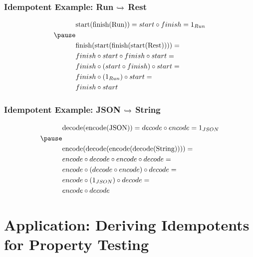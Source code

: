 \documentclass{beamer}
\begin{document}
\begin{frame}[fragile]
\frametitle{Idempotent Example: Run {$\xhookrightarrow{}$} Rest}
\medskip
\begin{equation*}
\begin{aligned}
& \text{start(finish(Run))} = start \circ finish = 1_{Run} \\ \pause
& \\
& \text{finish(start(finish(start(Rest))))} = \\
& finish \circ start \circ finish \circ start = \\
& finish \circ (start \circ finish) \circ start = \\
& finish \circ (1_{Run}) \circ start = \\
& finish \circ start \\
\end{aligned}
\end{equation*}
\end{frame}

\begin{frame}[fragile]
\frametitle{Idempotent Example: JSON {$\xhookrightarrow{}$} String}
\medskip
\begin{equation*}
\begin{aligned}
& \text{decode(encode(JSON))} = decode \circ encode = 1_{JSON} \\ \pause
& \\
& \text{encode(decode(encode(decode(String))))} = \\
& encode \circ decode \circ encode \circ decode = \\
& encode \circ (decode \circ encode) \circ decode = \\
& encode \circ (1_{JSON}) \circ decode = \\
& encode \circ decode \\
\end{aligned}
\end{equation*}
\end{frame}

\section{Application: Deriving Idempotents for Property Testing}
\end{document}

